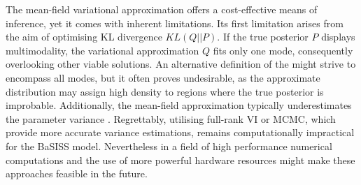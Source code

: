 The mean-field variational approximation offers a cost-effective means of inference, yet it comes with inherent limitations. Its first limitation arises from the aim of optimising KL divergence $KL(Q||P)$. If the true posterior $P$ displays multimodality, the variational approximation $Q$ fits only one mode, consequently overlooking other viable solutions. An alternative definition of the  might strive to encompass all modes, but it often proves undesirable, as the approximate distribution may assign high density to regions where the true posterior is improbable. Additionally, the mean-field approximation typically underestimates the parameter variance \parencite{Kucukelbir2016-gn}. Regrettably, utilising full-rank \ac{VI} or \ac{MCMC}, which provide more accurate variance estimations, remains computationally impractical for the \ac{BaSISS} model. Nevertheless  in a field of high performance numerical computations and the use of more powerful hardware resources might make these approaches feasible in the future. 